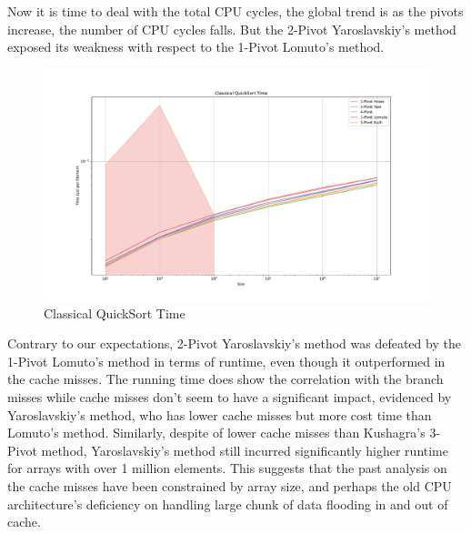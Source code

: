 \documentclass{article}
\newcommand{\bigO}{\mathcal{O}}
\begin{document}
Now it is time to deal with the total CPU cycles, the global trend is as the pivots increase, the number of CPU cycles falls.
But the 2-Pivot Yaroslavskiy's method exposed its weakness with respect to the 1-Pivot Lomuto's method. 

\begin{figure}[H]
    \hypertarget{fig:classicaltime}{}
    \caption{Classical QuickSort Time}
    \centering
    \hspace*{-0.27\textwidth}
    \includegraphics[width=1.5\textwidth]{Classical QuickSort Time.pdf}
\end{figure}


Contrary to our expectations, 2-Pivot Yaroslavskiy's method was defeated by the 1-Pivot Lomuto's method in terms of runtime, even though it outperformed in the cache misses.
The running time does show the correlation with the branch misses while cache misses don't seem to have a significant impact, evidenced by Yaroslavskiy's method, who has lower cache misses but more cost time than Lomuto's method.
Similarly, despite of lower cache misses than Kushagra's 3-Pivot method, Yaroslavskiy's method still incurred significantly higher runtime for arrays with over 1 million elements.
This suggests that the past analysis on the cache misses have been constrained by array size, and perhaps the old CPU architecture's deficiency on handling large chunk of data flooding in and out of cache.
\end{document}
